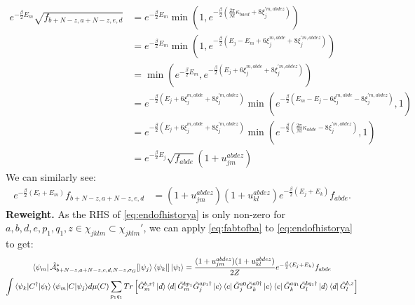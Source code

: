 \begin{equation}
    \begin{aligned}
    e^{-\frac{\beta}{2}E_m}\sqrt{f_{b+N-z,a+N-z,e,d}} &= e^{-\frac{\beta}{2}E_m}\min(1,e^{-\frac{\beta}{2}(\frac{2\pi}{Nt}\kappa_{baed}+ 8\xi^{\prime m,abdez}_j)})\\
    &= e^{-\frac{\beta}{2}E_m}\min(1,e^{-\frac{\beta}{2}(E_j-E_m + 6\xi^{m,abde}_j+ 8\xi^{\prime m,abdez}_j)})\\
    &= \min\!\left(e^{-\frac{\beta}{2}E_m}, e^{-\frac{\beta}{2}(E_j + 6\xi^{m,abde}_j+ 8\xi^{\prime m,abdez}_j)}\right)\\
    &= e^{-\frac{\beta}{2}(E_j+ 6\xi^{m,abde}_j+ 8\xi^{\prime m,abdez}_j)} \min(e^{-\frac{\beta}{2}(E_m-E_j-6\xi^{m,abde}_j- 8\xi^{\prime m,abdez}_j)},1)\\
     &= e^{-\frac{\beta}{2}(E_j+ 6\xi^{m,abde}_j+ 8\xi^{\prime m,abdez}_j)} \min(e^{-\frac{\beta}{2}(\frac{2\pi}{Nt}\kappa_{abde}- 8\xi^{\prime m,abdez}_j)},1)\\
    &= e^{-\frac{\beta}{2}E_j}\sqrt{f_{abde}}(1+u^{abdez}_{jm})
\end{aligned}
\end{equation}
 We can similarly see:
\begin{equation}
\begin{aligned}
e^{-\frac{\beta}{2}(E_l+E_m)}f_{b+N-z,a+N-z,e,d}
&=(1+u_{jm}^{abdez})(1+u_{kl}^{abdez})e^{-\frac{\beta}{2}(E_j+E_k)}f_{abde}.
\end{aligned}
\label{eq:fabtofba}
\end{equation}
\textbf{Reweight.} As the RHS of \eqref{eq:endofhistorya} is only non-zero for $a,b,d,e,p_1,q_1,z \in \chi_{jklm} \subset \chi_{jklm}'$, we can apply \eqref{eq:fabtofba} to \eqref{eq:endofhistorya} to get:
\begin{multline}
\bra{\psi_m}\tilde{\mathcal{A}}^*_{b+N-z,a+N-z,e,d,N-z,\sigma_G}[\ket{\psi_j}\bra{\psi_k}]\ket{\psi_l} 
   = \frac{(1+u_{jm}^{abdez})(1+u_{kl}^{abdez})}{2Z}   e^{-\frac{\beta}{2}(E_j+E_k)}{f_{abde}}  \\\int {\braket{\psi_k|C^{\dagger}|\psi_l}\braket{\psi_m|C|\psi_j}} d\mu(C)\sum_{p_1q_1}Tr\left[ {\tilde G_m^{b, z\dagger}\ket{d}\bra{d}\tilde G_m^{bp_1}} {\tilde G^{ap_1\dagger}_j\ket{e}\bra{e}\tilde G^{a0}_j } \tilde G^{a0\dagger}_k\ket{e}\bra{e}\tilde G^{aq_1}_k \tilde G_l^{bq_1\dagger}\ket{d}\bra{d}\tilde G_l^{b,z}\right]
\end{multline}
